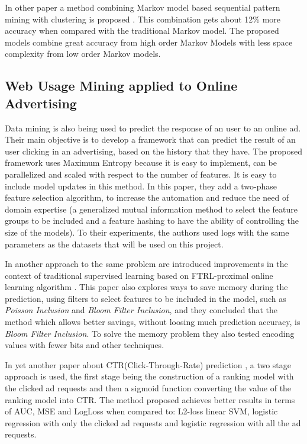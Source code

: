 In other paper a method combining Markov model based sequential pattern mining
with clustering is proposed \cite{Anitha_anew}. This combination gets about 12\%
more accuracy when compared with the traditional Markov model. The proposed
models combine great accuracy from high order Markov Models with less space
complexity from low order Markov models.

\subsection{Web Usage Mining applied to Online Advertising}

Data mining is also being used to predict the response of an user to an online
ad\cite{chapelle2013simple}. Their main objective is to develop a framework that
can predict the result of an user clicking in an advertising, based on the
history that they have. The proposed framework uses Maximum
Entropy\cite{Nigam99usingmaximum} because it is easy to implement, can be
parallelized and scaled with respect to the number of features. It is easy to
include model updates in this method. In this paper, they add a two-phase
feature selection algorithm, to increase the automation and reduce the need of
domain expertise (a generalized mutual information method to select the feature
groups to be included and a feature hashing to have the ability of controlling
the size of the models). To their experiments, the authors used logs with the
same parameters as the datasets that will be used on this project.

In another approach to the same problem are introduced improvements in the
context of traditional supervised learning based on FTRL-proximal online
learning algorithm \cite{McMahan:2013:ACP:2487575.2488200}. This paper also
explores ways to save memory during the prediction, using filters to select
features to be included in the model, such as \emph{Poisson Inclusion} and
\emph{Bloom Filter Inclusion}, and they concluded that the method which allows
better savings, without loosing much prediction accuracy, is \emph{Bloom Filter
Inclusion}. To solve the memory problem they also tested encoding values with
fewer bits and other techniques.

In yet another paper about CTR(Click-Through-Rate) prediction
\cite{Tagami:2013:CPC:2501040.2501978}, a two stage approach is used, the first
stage being the construction of a ranking model with the clicked ad requests and
then a sigmoid function converting the value of the ranking model into CTR. The
method proposed achieves better results in terms of AUC, MSE and LogLoss when
compared to: L2-loss linear SVM, logistic regression with only the clicked ad
requests and logistic regression with all the ad requests.

